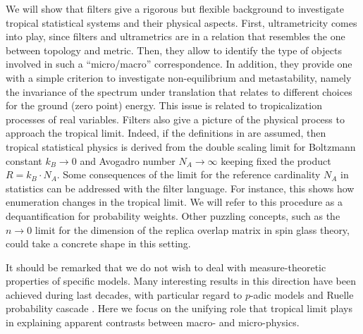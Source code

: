 \documentclass[11pt,british,reqno]{article}
\numberwithin{equation}{section}
\numberwithin{figure}{section}
\numberwithin{table}{section}
\theoremstyle{definition}
\theoremstyle{definition}
\theoremstyle{plain}
\theoremstyle{plain}
\theoremstyle{remark}
\theoremstyle{plain}
\numberwithin{equation}{section}
\numberwithin{figure}{section}
\numberwithin{table}{section}
\theoremstyle{plain}
\begin{document}
We will show that filters give a rigorous but flexible background
to investigate tropical statistical systems and their physical aspects. First, ultrametricity comes into play, since filters and ultrametrics are in a relation
that resembles the one between topology and metric. Then, they allow to identify the type of objects involved in such a ``micro/macro'' correspondence. In addition, they provide one with a simple criterion to investigate non-equilibrium
and metastability, namely the invariance of the spectrum under translation that relates to different choices for the ground (zero point) energy. This issue is related to tropicalization processes of real variables. Filters also give a picture of the physical process to approach the tropical limit. Indeed, if the definitions in \cite{AK2015} are assumed, then tropical statistical
physics is derived from the double scaling limit for Boltzmann constant
$k_{B}\rightarrow0$ and Avogadro number $N_{A}\rightarrow\infty$
keeping fixed the product $R=k_{B}\cdot N_{A}$. Some consequences
of the limit for the reference cardinality $N_{A}$ in statistics
can be addressed with the filter language. For instance, this shows how enumeration
changes in the tropical limit. We will refer to this procedure as
a dequantification for probability weights. Other puzzling
concepts, such as the $n\rightarrow0$ limit for the dimension of
the replica overlap matrix in spin glass theory, could take a concrete shape
in this setting.

It should be remarked that we do not wish to deal with measure-theoretic
properties of specific models. Many interesting results in this direction
have been achieved during last decades, with particular regard to $p$-adic
models \cite{Grossman1989} and Ruelle probability cascade \cite{Ruelle1987}.
Here we focus on the unifying role that tropical limit plays in explaining
apparent contrasts between macro- and micro-physics. 
\end{document}
